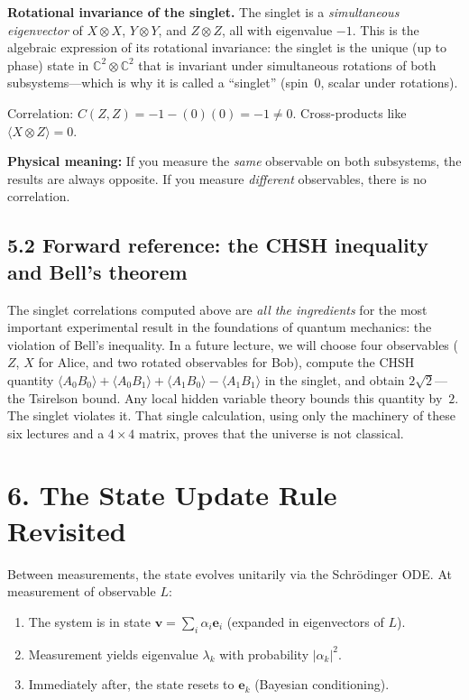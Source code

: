 \documentclass[12pt,a4paper]{article}
\begin{document}
\medskip
\noindent\textbf{Rotational invariance of the singlet.}  The singlet is a \emph{simultaneous eigenvector} of $X\otimes X$, $Y\otimes Y$, and $Z\otimes Z$, all with eigenvalue $-1$.  This is the algebraic expression of its rotational invariance: the singlet is the unique (up to phase) state in $\mathbb{C}^2\otimes\mathbb{C}^2$ that is invariant under simultaneous rotations of both subsystems---which is why it is called a ``singlet'' (spin~0, scalar under rotations).

\medskip
Correlation: $C(Z,Z) = -1 - (0)(0) = -1 \neq 0$.  Cross-products like $\langle X \otimes Z \rangle = 0$.

\medskip
\noindent\textbf{Physical meaning:} If you measure the \emph{same} observable on both subsystems, the results are always opposite.  If you measure \emph{different} observables, there is no correlation.

\subsection{5.2 Forward reference: the CHSH inequality and Bell's theorem}
The singlet correlations computed above are \emph{all the ingredients} for the most important experimental result in the foundations of quantum mechanics: the violation of Bell's inequality.  In a future lecture, we will choose four observables ($Z$, $X$ for Alice, and two rotated observables for Bob), compute the CHSH quantity $\langle A_0 B_0\rangle + \langle A_0 B_1\rangle + \langle A_1 B_0\rangle - \langle A_1 B_1\rangle$ in the singlet, and obtain $2\sqrt{2}$---the Tsirelson bound.  Any local hidden variable theory bounds this quantity by~$2$.  The singlet violates it.  That single calculation, using only the machinery of these six lectures and a $4\times 4$ matrix, proves that the universe is not classical.

\section{6. The State Update Rule Revisited}

Between measurements, the state evolves unitarily via the Schr\"odinger ODE.  At measurement of observable $L$:

\begin{enumerate}[nosep]
    \item The system is in state $\mathbf{v}=\sum_i \alpha_i\mathbf{e}_i$ (expanded in eigenvectors of $L$).
    \item Measurement yields eigenvalue $\lambda_k$ with probability $|\alpha_k|^2$.
    \item Immediately after, the state resets to $\mathbf{e}_k$ (Bayesian conditioning).
\end{enumerate}
\end{document}

